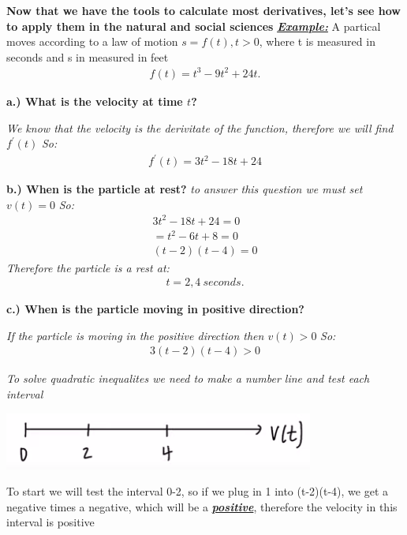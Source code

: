 \documentclass{report}
\begin{document}
  \bigbreak \noindent 
  \begin{mdframed}
    \textbf{Now that we have the tools to calculate most derivatives, let's see how to
      apply them in the natural and social sciences
    }
    \medbreak \noindent
    \textbf{\textit{\underline{Example:}}} A partical moves according to a law 
    of motion $s = f(t), t>0$, where t is measured in seconds and s in measured in feet
     \begin{align*}
      f(t) = t^{3} -9t^{2}+24t
    .\end{align*}
  \end{mdframed}
  \bigbreak \noindent 
  \textbf{a.) What is the velocity at time $t$?}

   \bigbreak \noindent 
   \textit{We know that the velocity is the derivitate of the function, therefore we will find $f^{\prime}(t)$}
   \bigbreak \noindent
   \textit{So:}
   \begin{align*}
     \boxed{f^{\prime}(t) = 3t^{2}-18t+24}
   \end{align*}
   
   \bigbreak \noindent 
   \textbf{b.) When is the particle at rest?}
   \bigbreak \noindent 
   \textit{to answer this question we must set $v(t) = 0$}
   \bigbreak \noindent
   \textit{So:}
   \begin{align*}
     3t^{2} -18t+24 = 0 \\
     = t^{2} -6t +8 = 0 \\
     (t-2)(t-4) = 0
   \end{align*}
   \bigbreak \noindent 
   \textit{Therefore the particle is a rest at:}
   \begin{align*}
     t = 2,4\ seconds
   .\end{align*}

   \bigbreak \noindent 
   \textbf{c.) When is the particle moving in positive direction?}

   \bigbreak \noindent 
   \textit{If the particle is moving in the positive direction then $v(t)>0$}
   \bigbreak \noindent
   \textit{So:}
   \begin{align*}
     3(t-2)(t-4)>0
   \end{align*}

   \bigbreak \noindent 
   \textit{To solve quadratic inequalites we need to make a number line and test each interval}
   \bigbreak \noindent 
   \begin{center}
     \includegraphics[scale=1]{1.png  }
   \end{center}
   \bigbreak \noindent 
   To start we will test the interval 0-2, so if we plug in 1 into (t-2)(t-4), we get
   a negative times a negative, which will be a \textbf{\textit{\underline{positive}}},
   therefore the velocity in this interval is positive
\end{document}
